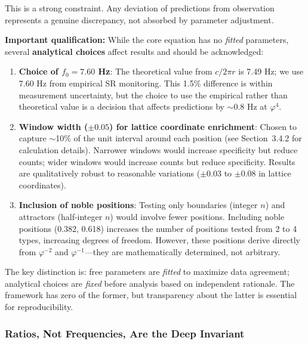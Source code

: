 \documentclass[11pt,a4paper]{article}
\newcommand{\phisym}{\varphi}
\newcommand{\fzero}{f_0}
\begin{document}
This is a strong constraint. Any deviation of predictions from observation represents a genuine discrepancy, not absorbed by parameter adjustment.

\begin{criticalpoint}
\textbf{Important qualification:} While the core equation has no \textit{fitted} parameters, several \textbf{analytical choices} affect results and should be acknowledged:

\begin{enumerate}
    \item \textbf{Choice of $\fzero = 7.60$ Hz}: The theoretical value from $c/2\pi r$ is 7.49 Hz; we use 7.60 Hz from empirical SR monitoring. This 1.5\% difference is within measurement uncertainty, but the choice to use the empirical rather than theoretical value is a decision that affects predictions by $\sim$0.8 Hz at $\phisym^4$.

    \item \textbf{Window width ($\pm 0.05$) for lattice coordinate enrichment}: Chosen to capture $\sim$10\% of the unit interval around each position (see Section~3.4.2 for calculation details). Narrower windows would increase specificity but reduce counts; wider windows would increase counts but reduce specificity. Results are qualitatively robust to reasonable variations ($\pm 0.03$ to $\pm 0.08$ in lattice coordinates).

    \item \textbf{Inclusion of noble positions}: Testing only boundaries (integer $n$) and attractors (half-integer $n$) would involve fewer positions. Including noble positions (0.382, 0.618) increases the number of positions tested from 2 to 4 types, increasing degrees of freedom. However, these positions derive directly from $\phisym^{-2}$ and $\phisym^{-1}$---they are mathematically determined, not arbitrary.
\end{enumerate}
\end{criticalpoint}

The key distinction is: free parameters are \textit{fitted} to maximize data agreement; analytical choices are \textit{fixed} before analysis based on independent rationale. The framework has zero of the former, but transparency about the latter is essential for reproducibility.

\subsubsection{Ratios, Not Frequencies, Are the Deep Invariant}
\end{document}

